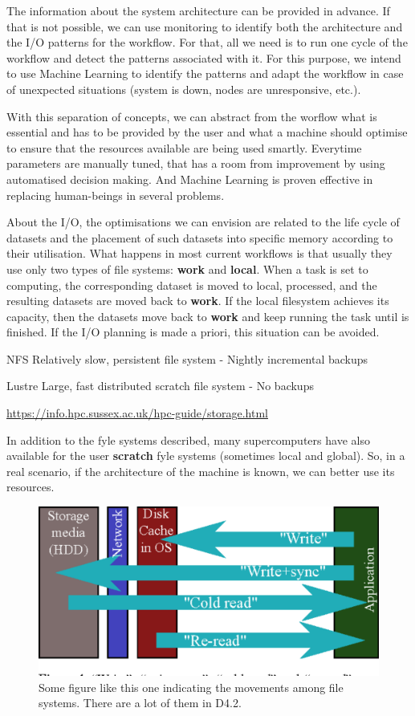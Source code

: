 \documentclass[a4paper]{article}
\begin{document}
The information about the system architecture can be provided in advance. If that is not possible, we can use monitoring to identify both the architecture and the I/O patterns for the workflow. For that, all we need is to run one cycle of the workflow and detect the patterns associated with it. For this purpose, we intend to use Machine Learning to identify the patterns and adapt the workflow in case of unexpected situations (system is down, nodes are unresponsive, etc.).

With this separation of concepts, we can abstract from the worflow what is essential and has to be provided by the user and what a machine should optimise to ensure that the resources available are being used smartly. Everytime parameters are manually tuned, that has a room from improvement by using automatised decision making. And Machine Learning is proven effective in replacing human-beings in several problems.

About the I/O, the optimisations we can envision are related to the life cycle of datasets and the placement of such datasets into specific memory according to their utilisation. What happens in most current workflows is that usually they use only two types of file systems: \textbf{work} and \textbf{local}. When a task is set to computing, the corresponding dataset is moved to local, processed, and the resulting datasets are moved back to \textbf{work}. If the local filesystem achieves its capacity, then the datasets move back to \textbf{work} and keep running the task until is finished. If the I/O planning is made a priori, this situation can be avoided.

\begin{description}

\item{NFS} Relatively slow, persistent file system - Nightly incremental backups

\item{Lustre} Large, fast distributed scratch file system - No backups

\url{https://info.hpc.sussex.ac.uk/hpc-guide/storage.html}

\end{description}

In addition to the fyle systems described, many supercomputers have also available for the user \textbf{scratch} fyle systems (sometimes local and global). So, in a real scenario, if the architecture of the machine is known, we can better use its resources.

\begin{figure}[H]
  \centering
  \includegraphics[width=0.6\columnwidth]{move}
  \caption{Some figure like this one indicating the movements among file systems. There are a lot of them in D4.2.}
  \label{fig:move}
\end{figure}
\end{document}
